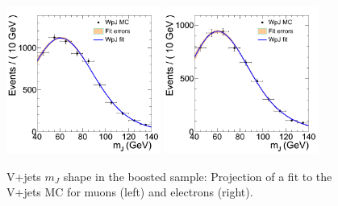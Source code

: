 \begin{figure}
\begin{center}
\includegraphics[width=0.45\textwidth]{figs/wpj/DibosonBoostedlnuJ_WpJ_muon_2jets.png}
\includegraphics[width=0.45\textwidth]{figs/wpj/DibosonBoostedlnuJ_WpJ_electron_2jets.png}
\end{center}
\caption{\label{fig:WpJFit} V+jets $m_{J}$ shape in the boosted sample:
Projection of a fit to the V+jets MC for muons (left) and electrons (right).}
\label{fig:WpJFit_Boosted}
\end{figure}


